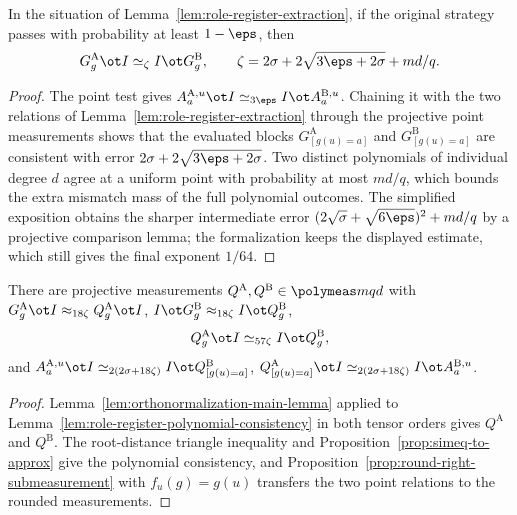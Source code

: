 \begin{lemma}\label{lem:role-register-polynomial-consistency}
	\leanok
	In the situation of Lemma~\ref{lem:role-register-extraction}, if the
	original strategy passes with probability at least $1-\eps$, then
	\[
		G^{\mathrm A}_g\ot I\simeq_\zeta I\ot G^{\mathrm B}_g,\qquad
		\zeta=2\sigma+2\sqrt{3\eps+2\sigma}+md/q.
	\]
\end{lemma}
\begin{proof}
	\leanok
	The point test gives $A^{\mathrm A,u}_a\ot I\simeq_{3\eps}I\ot
		A^{\mathrm B,u}_a$.  Chaining it with the two relations of
	Lemma~\ref{lem:role-register-extraction} through the projective point
	measurements shows that the evaluated blocks
	$G^{\mathrm A}_{[g(u)=a]}$ and $G^{\mathrm B}_{[g(u)=a]}$ are consistent
	with error $2\sigma+2\sqrt{3\eps+2\sigma}$.  Two distinct polynomials of
	individual degree $d$ agree at a uniform point with probability at most
	$md/q$, which bounds the extra mismatch mass of the full polynomial
	outcomes.  The simplified exposition obtains the sharper intermediate
	error $(2\sqrt\sigma+\sqrt{6\eps})^2+md/q$ by a projective comparison
	lemma; the formalization keeps the displayed estimate, which still gives
	the final exponent $1/64$.
\end{proof}

\begin{lemma}\label{lem:role-register-rounding}
	\leanok
	There are projective measurements
	$Q^{\mathrm A},Q^{\mathrm B}\in\polymeas mqd$ with
	$G^{\mathrm A}_g\ot I\approx_{18\zeta}Q^{\mathrm A}_g\ot I$,
	$I\ot G^{\mathrm B}_g\approx_{18\zeta}I\ot Q^{\mathrm B}_g$,
	\[
		Q^{\mathrm A}_g\ot I\simeq_{57\zeta}I\ot Q^{\mathrm B}_g,
	\]
	and
	$A^{\mathrm A,u}_a\ot I\simeq_{2(2\sigma+18\zeta)}I\ot Q^{\mathrm B}_{[g(u)=a]}$,
	$Q^{\mathrm A}_{[g(u)=a]}\ot I\simeq_{2(2\sigma+18\zeta)}I\ot A^{\mathrm B,u}_a$.
\end{lemma}
\begin{proof}
	\leanok
	Lemma~\ref{lem:orthonormalization-main-lemma} applied to
	Lemma~\ref{lem:role-register-polynomial-consistency} in both tensor
	orders gives $Q^{\mathrm A}$ and $Q^{\mathrm B}$.  The root-distance
	triangle inequality and Proposition~\ref{prop:simeq-to-approx} give the
	polynomial consistency, and
	Proposition~\ref{prop:round-right-submeasurement} with $f_u(g)=g(u)$
	transfers the two point relations to the rounded measurements.
\end{proof}

